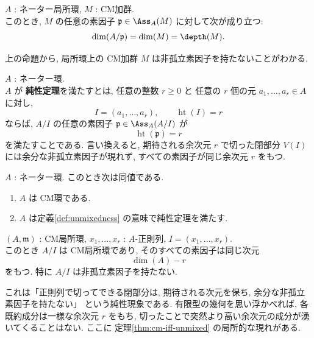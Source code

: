 \documentclass[article,paper=b5paper]{jlreq}
\begin{document}
\begin{prop}\label{prop:cm-associated-primes}
    \quad $A$ : ネーター局所環, $M$ : CM加群. \\
    このとき, $M$ の任意の素因子 $\mathfrak{p} \in \Ass_{A}(M)$ に対して次が成り立つ:
    \[\dim(A/\mathfrak{p}) = \dim(M) = \depth(M).\]
\end{prop}

\begin{rem}
    上の命題から, 局所環上の CM加群 $M$ は非孤立素因子を持たないことがわかる.
\end{rem}

\begin{dfn}\label{def:unmixedness}
    \quad $A$ : ネーター環. \\
    $A$ が \textbf{純性定理}を満たすとは, 任意の整数 $r\ge 0$ と
    任意の $r$ 個の元 $a_1,\dots,a_r\in A$ に対し,
    \[
        I=(a_1,\dots,a_r),\qquad \operatorname{ht}(I)=r
    \]
    ならば, $A/I$ の任意の素因子 $\mathfrak{p}\in \Ass_A(A/I)$ が
    \[
        \operatorname{ht}(\mathfrak{p})=r
    \]
    を満たすことである. 言い換えると, 期待される余次元 $r$ で切った閉部分
    $V(I)$ には余分な非孤立素因子が現れず, すべての素因子が同じ余次元 $r$ をもつ.
\end{dfn}

\begin{thm}\label{thm:cm-iff-unmixed}
    \quad $A$ : ネーター環. \quad このとき次は同値である.
    \begin{enumerate}
        \item $A$ は CM環である.
        \item $A$ は定義\ref{def:unmixedness} の意味で純性定理を満たす.
    \end{enumerate}
\end{thm}

\begin{cor}\label{cor:purity-local}
    \quad $(A,\mathfrak{m})$ : CM局所環, $x_1,\dots,x_r$ : $A$-正則列,
    $I=(x_1,\dots,x_r)$. \\
    このとき $A/I$ は CM局所環であり, そのすべての素因子は同じ次元
    \[
        \dim(A)-r
    \]
    をもつ. 特に $A/I$ は非孤立素因子を持たない.
\end{cor}

\begin{rem}
    これは「正則列で切ってできる閉部分は, 期待される次元を保ち, 余分な非孤立素因子を持たない」
    という純性現象である. 有限型の幾何を思い浮かべれば, 各既約成分は一様な余次元 $r$ をもち,
    切ったことで突然より高い余次元の成分が湧いてくることはない. ここに
    定理\ref{thm:cm-iff-unmixed} の局所的な現れがある.
\end{rem}
\end{document}
